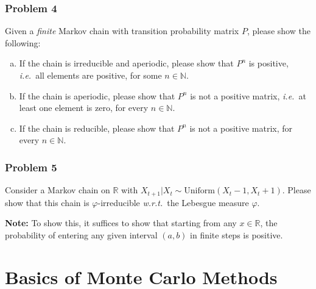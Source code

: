 \documentclass[a4paper,11pt]{article}
\newcommand{\nsp}{\mathbb{N}}
\newcommand{\rsp}{\mathbb{R}}
\begin{document}
\section*{Problem 4}

Given a \textit{finite} Markov chain with transition probability matrix $P$, please show the following:

\begin{enumerate}[(a)]

\item If the chain is irreducible and aperiodic, please show that $P^n$ is positive, \textit{i.e.}~all elements are positive, for some $n \in \nsp$. 

\item If the chain is aperiodic, please show that $P^n$ is not a positive matrix, \textit{i.e.}~at least one element is zero, for every $n \in \nsp$.

\item If the chain is reducible, please show that $P^n$ is not a positive matrix, for every $n \in \nsp$. 

\end{enumerate}


\section*{Problem 5}

Consider a Markov chain on $\mathbb{R}$ with $X_{t+1} | X_t \sim \mathrm{Uniform}(X_t - 1, X_t + 1)$. Please show that this chain is $\varphi$-irreducible \textit{w.r.t.}~the Lebesgue measure $\varphi$.

\noindent \textbf{Note:} To show this, it suffices to show that starting from any $x \in \rsp$, the probability of entering any given interval $(a, b)$ in finite steps is positive. 


\part{Basics of Monte Carlo Methods}
\end{document}
